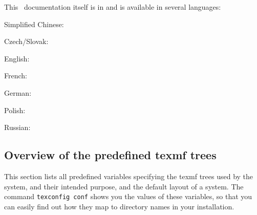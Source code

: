 \documentclass{article}
\begin{document}
This \TL\ documentation itself is in  and is
available in several languages:

\begin{itemize*}
\item{Simplified Chinese:} 
\item{Czech/Slovak:} 
\item{English:} 
\item{French:} 
\item{German:} 
\item{Polish:} 
\item{Russian:} 
\end{itemize*}

\subsection{Overview of the predefined texmf trees}
\label{sec:texmftrees}

This section lists all predefined variables specifying the texmf trees
used by the system, and their intended purpose, and the default
layout of a \TL{} system. The command \texttt{texconfig conf} shows
you the values of these variables, so that you can easily find out
how they map to directory names in your installation.
\end{document}
